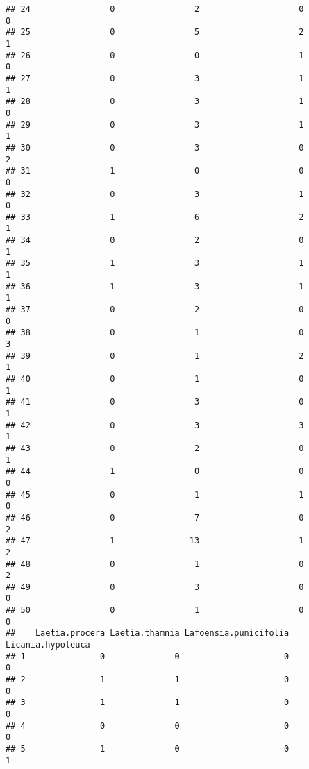\documentclass[
]{article}
\begin{document}
\begin{verbatim}
## 24                0                2                    0                    0
## 25                0                5                    2                    1
## 26                0                0                    1                    0
## 27                0                3                    1                    1
## 28                0                3                    1                    0
## 29                0                3                    1                    1
## 30                0                3                    0                    2
## 31                1                0                    0                    0
## 32                0                3                    1                    0
## 33                1                6                    2                    1
## 34                0                2                    0                    1
## 35                1                3                    1                    1
## 36                1                3                    1                    1
## 37                0                2                    0                    0
## 38                0                1                    0                    3
## 39                0                1                    2                    1
## 40                0                1                    0                    1
## 41                0                3                    0                    1
## 42                0                3                    3                    1
## 43                0                2                    0                    1
## 44                1                0                    0                    0
## 45                0                1                    1                    0
## 46                0                7                    0                    2
## 47                1               13                    1                    2
## 48                0                1                    0                    2
## 49                0                3                    0                    0
## 50                0                1                    0                    0
##    Laetia.procera Laetia.thamnia Lafoensia.punicifolia Licania.hypoleuca
## 1               0              0                     0                 0
## 2               1              1                     0                 0
## 3               1              1                     0                 0
## 4               0              0                     0                 0
## 5               1              0                     0                 1

\end{verbatim}
\end{document}
